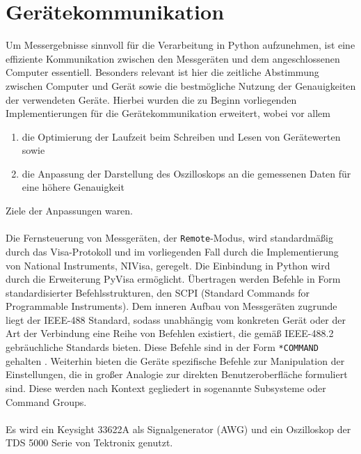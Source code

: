 \documentclass[../Report.tex]{subfiles}
\begin{document}
\chapter{Gerätekommunikation}
\label{sec:vorg.geraete}

Um Messergebnisse sinnvoll für die Verarbeitung in Python aufzunehmen, ist eine effiziente Kommunikation zwischen den Messgeräten und dem angeschlossenen Computer essentiell. Besonders relevant ist hier die zeitliche Abstimmung zwischen Computer und Gerät sowie die bestmögliche Nutzung der Genauigkeiten der verwendeten Geräte. 
Hierbei wurden die zu Beginn vorliegenden Implementierungen für die Gerätekommunikation erweitert, wobei vor allem
\begin{enumerate}
	\item die Optimierung der Laufzeit beim Schreiben und Lesen von Gerätewerten sowie
	\item die Anpassung der Darstellung des Oszilloskops an die gemessenen Daten für eine höhere Genauigkeit
\end{enumerate}
Ziele der Anpassungen waren.
\\
\\
Die Fernsteuerung von Messgeräten, der \lstinline{Remote}-Modus, wird standardmäßig durch das Visa-Protokoll und im vorliegenden Fall durch die Implementierung von National Instruments, NIVisa, geregelt. Die Einbindung in Python wird durch die Erweiterung PyVisa ermöglicht. Übertragen werden Befehle in Form standardisierter Befehlsstrukturen, den SCPI (Standard Commands for Programmable Instruments). Dem inneren Aufbau von Messgeräten zugrunde liegt der IEEE-488 Standard, sodass unabhängig vom konkreten Gerät oder der Art der Verbindung eine Reihe von Befehlen existiert, die gemäß IEEE-488.2 gebräuchliche Standards bieten. Diese Befehle sind in der Form \lstinline{*COMMAND} gehalten \cite[S. 224 ff.]{keysHand15}. 
Weiterhin bieten die Geräte spezifische Befehle zur Manipulation der Einstellungen, die in großer Analogie zur direkten Benutzeroberfläche formuliert sind. Diese werden nach Kontext gegliedert in sogenannte Subsysteme oder Command Groups.
\\
\\
\noindent
Es wird ein Keysight 33622A als Signalgenerator (AWG) und ein Oszilloskop der TDS 5000 Serie von Tektronix genutzt.
\end{document}
